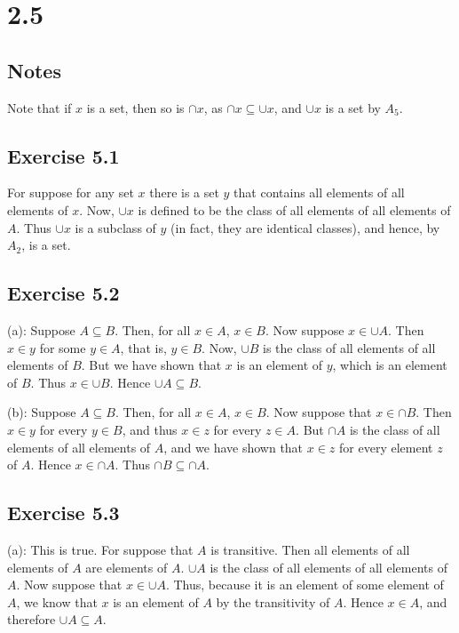 \documentclass{article}
\theoremstyle{definition}
\begin{document}
\section*{2.5}

\subsection*{Notes}
Note that if $x$ is a set, then so is $\cap x$, as $\cap x\subseteq\cup x$, and $\cup x$ is a set by $A_5$.

\subsection*{Exercise 5.1}
For suppose for any set $x$ there is a set $y$ that contains all elements of all elements of $x$. Now, $\cup x$ is defined to be the class of all elements of all elements 
of $A$. Thus $\cup x$ is a subclass of $y$ (in fact, they are identical classes), and hence, by $A_2$, is a set.

\subsection*{Exercise 5.2}
(a): Suppose $A\subseteq B$. Then, for all $x\in A$, $x\in B$. Now suppose $x\in \cup A$. Then $x\in y$ for some $y\in A$, that is, $y\in B$. Now, $\cup B$ is the class 
of all elements of all elements of $B$. But we have shown that $x$ is an element of $y$, which is an element of $B$. Thus $x\in \cup B$.
Hence $\cup A\subseteq B$.


(b): Suppose $A\subseteq B$. Then, for all $x\in A$, $x\in B$. Now suppose that $x\in\cap B$. Then $x\in y$ for every $y\in B$, and thus $x\in z$ for every 
$z\in A$. But $\cap A$ is the class of all elements of all elements of $A$, and we have shown that $x\in z$ for every element $z$ of $A$. Hence $x\in\cap A$. 
Thus $\cap B\subseteq\cap A$.

\subsection*{Exercise 5.3}
(a): This is true. For suppose that $A$ is transitive. Then all elements of all elements of $A$ are elements of $A$. $\cup A$ is the class of all elements of all elements of 
$A$. Now suppose that $x\in\cup A$. Thus, because it is an element of some element of $A$, we know that $x$ is an element of $A$ by the transitivity of $A$. Hence 
$x\in A$, and therefore $\cup A\subseteq A$.
\end{document}
